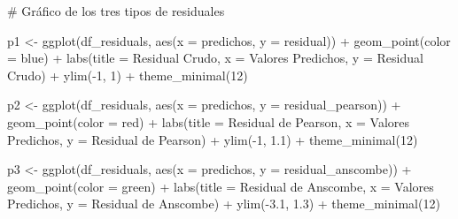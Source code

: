 \documentclass[
  letterpaper,
  DIV=11,
  numbers=noendperiod]{scrartcl}
\newenvironment{Shaded}{\begin{snugshade}}{\end{snugshade}}
\newcommand{\AttributeTok}[1]{\textcolor[rgb]{0.40,0.45,0.13}{#1}}
\newcommand{\CommentTok}[1]{\textcolor[rgb]{0.37,0.37,0.37}{#1}}
\newcommand{\DecValTok}[1]{\textcolor[rgb]{0.68,0.00,0.00}{#1}}
\newcommand{\FloatTok}[1]{\textcolor[rgb]{0.68,0.00,0.00}{#1}}
\newcommand{\FunctionTok}[1]{\textcolor[rgb]{0.28,0.35,0.67}{#1}}
\newcommand{\NormalTok}[1]{\textcolor[rgb]{0.00,0.23,0.31}{#1}}
\newcommand{\OtherTok}[1]{\textcolor[rgb]{0.00,0.23,0.31}{#1}}
\newcommand{\SpecialCharTok}[1]{\textcolor[rgb]{0.37,0.37,0.37}{#1}}
\newcommand{\StringTok}[1]{\textcolor[rgb]{0.13,0.47,0.30}{#1}}
\begin{document}
\begin{Shaded}
\begin{Highlighting}[]
\CommentTok{\# Gráfico de los tres tipos de residuales}

\NormalTok{p1 }\OtherTok{\textless{}{-}} \FunctionTok{ggplot}\NormalTok{(df\_residuals, }\FunctionTok{aes}\NormalTok{(}\AttributeTok{x =}\NormalTok{ predichos, }\AttributeTok{y =}\NormalTok{ residual)) }\SpecialCharTok{+}
    \FunctionTok{geom\_point}\NormalTok{(}\AttributeTok{color =} \StringTok{\textquotesingle{}blue\textquotesingle{}}\NormalTok{) }\SpecialCharTok{+}
    \FunctionTok{labs}\NormalTok{(}\AttributeTok{title =} \StringTok{\textquotesingle{}Residual Crudo\textquotesingle{}}\NormalTok{, }\AttributeTok{x =} \StringTok{\textquotesingle{}Valores Predichos\textquotesingle{}}\NormalTok{, }\AttributeTok{y =} \StringTok{\textquotesingle{}Residual Crudo\textquotesingle{}}\NormalTok{) }\SpecialCharTok{+}
    \FunctionTok{ylim}\NormalTok{(}\SpecialCharTok{{-}}\DecValTok{1}\NormalTok{, }\DecValTok{1}\NormalTok{) }\SpecialCharTok{+} 
    \FunctionTok{theme\_minimal}\NormalTok{(}\DecValTok{12}\NormalTok{)}

\NormalTok{p2 }\OtherTok{\textless{}{-}} \FunctionTok{ggplot}\NormalTok{(df\_residuals, }\FunctionTok{aes}\NormalTok{(}\AttributeTok{x =}\NormalTok{ predichos, }\AttributeTok{y =}\NormalTok{ residual\_pearson)) }\SpecialCharTok{+}
    \FunctionTok{geom\_point}\NormalTok{(}\AttributeTok{color =} \StringTok{\textquotesingle{}red\textquotesingle{}}\NormalTok{) }\SpecialCharTok{+}
    \FunctionTok{labs}\NormalTok{(}\AttributeTok{title =} \StringTok{\textquotesingle{}Residual de Pearson\textquotesingle{}}\NormalTok{, }\AttributeTok{x =} \StringTok{\textquotesingle{}Valores Predichos\textquotesingle{}}\NormalTok{, }\AttributeTok{y =} \StringTok{\textquotesingle{}Residual de Pearson\textquotesingle{}}\NormalTok{) }\SpecialCharTok{+}
    \FunctionTok{ylim}\NormalTok{(}\SpecialCharTok{{-}}\DecValTok{1}\NormalTok{, }\FloatTok{1.1}\NormalTok{) }\SpecialCharTok{+}
    \FunctionTok{theme\_minimal}\NormalTok{(}\DecValTok{12}\NormalTok{)}

\NormalTok{p3 }\OtherTok{\textless{}{-}} \FunctionTok{ggplot}\NormalTok{(df\_residuals, }\FunctionTok{aes}\NormalTok{(}\AttributeTok{x =}\NormalTok{ predichos, }\AttributeTok{y =}\NormalTok{ residual\_anscombe)) }\SpecialCharTok{+}
    \FunctionTok{geom\_point}\NormalTok{(}\AttributeTok{color =} \StringTok{\textquotesingle{}green\textquotesingle{}}\NormalTok{) }\SpecialCharTok{+}
    \FunctionTok{labs}\NormalTok{(}\AttributeTok{title =} \StringTok{\textquotesingle{}Residual de Anscombe\textquotesingle{}}\NormalTok{, }\AttributeTok{x =} \StringTok{\textquotesingle{}Valores Predichos\textquotesingle{}}\NormalTok{, }\AttributeTok{y =} \StringTok{\textquotesingle{}Residual de Anscombe\textquotesingle{}}\NormalTok{) }\SpecialCharTok{+}
    \FunctionTok{ylim}\NormalTok{(}\SpecialCharTok{{-}}\FloatTok{3.1}\NormalTok{, }\FloatTok{1.3}\NormalTok{) }\SpecialCharTok{+}
    \FunctionTok{theme\_minimal}\NormalTok{(}\DecValTok{12}\NormalTok{)}


\end{Highlighting}
\end{Shaded}
\end{document}
